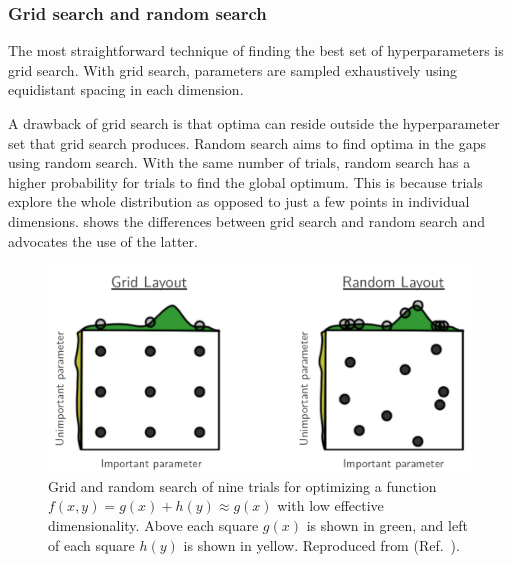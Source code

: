 \subsubsection{Grid search and random search}
The most straightforward technique of finding the best set of hyperparameters is grid search.
With grid search, parameters are sampled exhaustively using equidistant spacing in each dimension.

A drawback of grid search is that optima can reside outside the hyperparameter set that grid search produces.
Random search \cite{Bergstra2012} aims to find optima in the gaps using random search.
With the same number of trials, random search has a higher probability for trials to find the global optimum.
This is because trials explore the whole distribution as opposed to just a few points in individual dimensions.
 shows the differences between grid search and random search and advocates the use of the latter.

\begin{figure}
    \includegraphics[width=\linewidth]{images/gridrandsearch.png}
    \caption[Grid and random search]{
        Grid and random search of nine trials for optimizing a function $f(x, y) = g(x) + h(y) \approx g(x)$ with low effective dimensionality.
        Above each square $g(x)$ is shown in green, and left of each square $h(y)$ is shown in yellow.
        Reproduced from  (Ref.~\cite{Bergstra2012}).
    }
    \label{fig:gridrandsearch}
\end{figure}


